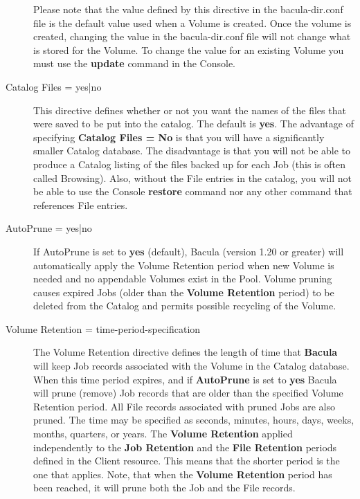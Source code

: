 \begin{description}
Please note that the value defined by this directive in the  bacula-dir.conf
file is the default value used when a Volume  is created. Once the volume is
created, changing the value  in the bacula-dir.conf file will not change what
is stored  for the Volume. To change the value for an existing Volume  you
must use the {\bf update} command in the Console.  

\item [Catalog Files = \lt{}yes|no\gt{}]
   This directive  defines whether or not you want the names of the files  that
were saved to be put into the catalog. The default  is {\bf yes}. The
advantage of specifying {\bf Catalog Files = No}  is that you will have a
significantly smaller Catalog database. The  disadvantage is that you will not
be able to produce a Catalog listing  of the files backed up for each Job
(this is often called Browsing).  Also, without the File entries in the
catalog, you will not be  able to use the Console {\bf restore} command nor
any other  command that references File entries.  
\label{PoolAutoPrune}

\item [AutoPrune = \lt{}yes|no\gt{}]
   If AutoPrune is set to  {\bf yes} (default), Bacula (version 1.20 or greater)
will  automatically apply the Volume Retention period when new Volume  is
needed and no appendable Volumes exist in the Pool. Volume  pruning causes
expired Jobs (older than the {\bf Volume  Retention} period) to be deleted
from the Catalog and permits  possible recycling of the Volume.  
\label{VolRetention}

\item [Volume Retention = \lt{}time-period-specification\gt{}]
   The  Volume Retention directive defines the length of time that {\bf Bacula} 
will keep Job records associated with the Volume in the Catalog  database.
When this time period expires, and if {\bf AutoPrune}  is set to {\bf yes}
Bacula will prune (remove) Job  records that are older than the specified
Volume Retention period.  All File records associated with pruned Jobs are
also pruned.  The time may be specified as seconds,  minutes, hours, days,
weeks, months, quarters, or years.  The {\bf Volume Retention} applied
independently to the  {\bf Job Retention} and the {\bf File Retention} periods
defined in the Client resource. This means that the shorter  period is the
one that applies. Note, that when the  {\bf Volume Retention} period has been
reached, it will  prune both the Job and the File records.  


\end{description}
